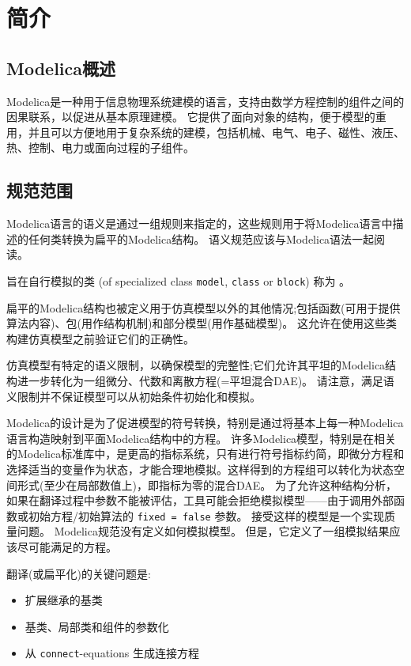 \chapter{简介}\label{introduction1}

\section{Modelica概述}\label{overview-of-modelica}

Modelica是一种用于信息物理系统建模的语言，支持由数学方程控制的组件之间的因果联系，以促进从基本原理建模。
它提供了面向对象的结构，便于模型的重用，并且可以方便地用于复杂系统的建模，包括机械、电气、电子、磁性、液压、热、控制、电力或面向过程的子组件。

\section{规范范围}\label{scope-of-the-specification}

Modelica语言的语义是通过一组规则来指定的，这些规则用于将Modelica语言中描述的任何类转换为扁平的Modelica结构。
语义规范应该与Modelica语法一起阅读。

旨在自行模拟的类 (of specialized class \lstinline!model!, \lstinline!class! or \lstinline!block!) 称为 。

扁平的Modelica结构也被定义用于仿真模型以外的其他情况;包括函数(可用于提供算法内容)、包(用作结构机制)和部分模型(用作基础模型)。
这允许在使用这些类构建仿真模型之前验证它们的正确性。

仿真模型有特定的语义限制，以确保模型的完整性;它们允许其平坦的Modelica结构进一步转化为一组微分、代数和离散方程(=平坦混合DAE)。
请注意，满足语义限制并不保证模型可以从初始条件初始化和模拟。

Modelica的设计是为了促进模型的符号转换，特别是通过将基本上每一种Modelica语言构造映射到平面Modelica结构中的方程。
许多Modelica模型，特别是在相关的Modelica标准库中，是更高的指标系统，只有进行符号指标约简，即微分方程和选择适当的变量作为状态，才能合理地模拟。这样得到的方程组可以转化为状态空间形式(至少在局部数值上)，即指标为零的混合DAE。
为了允许这种结构分析，如果在翻译过程中参数不能被评估，工具可能会拒绝模拟模型——由于调用外部函数或初始方程/初始算法的 \lstinline!fixed = false! 参数。
接受这样的模型是一个实现质量问题。
Modelica规范没有定义如何模拟模型。
但是，它定义了一组模拟结果应该尽可能满足的方程。

翻译(或扁平化)的关键问题是:
\begin{itemize}
\item
  扩展继承的基类
\item
  基类、局部类和组件的参数化
\item
  从 \lstinline!connect!-equations 生成连接方程
\end{itemize}

